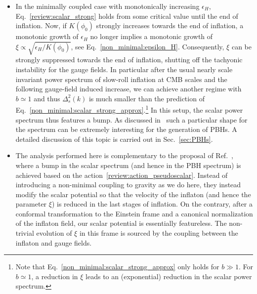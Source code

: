 \begin{itemize}
	\item In the minimally coupled case with monotonically increasing $\epsilon_H$, Eq.~\eqref{review:scalar_strong} holds from some critical value until the end of inflation. Now, if $K(\phi_0)$ strongly increases towards the end of inflation, a monotonic growth of $\epsilon_H$ no longer implies a monotonic growth of $\xi \propto \sqrt{\epsilon_H/K(\phi_0)}$, see Eq.~\eqref{non_minimal:epsilon_H}. Consequently, $\xi$ can be strongly suppressed towards the end of inflation, shutting off the tachyonic instability for the gauge fields. In particular after the usual nearly scale invariant power spectrum of slow-roll inflation at CMB scales and the following gauge-field induced increase, we can achieve another regime with $ b \simeq 1$ and thus $\Delta^2_s (k)$ is much smaller than the prediction of Eq.~\eqref{non_minimal:scalar_strong_approx}.\footnote{Note that Eq.~\eqref{non_minimal:scalar_strong_approx} only holds for $b \gg 1$. For $b \simeq 1$, a reduction in $\xi$ leads to an (exponential) reduction in the scalar power spectrum.} In this setup, the scalar power spectrum thus features a bump. As discussed in~\cite{Clesse:2015wea} such a particular shape for the spectrum can be extremely interesting for the generation of PBHs. A detailed discussion of this topic is carried out in Sec.~\ref{sec:PBHs}.

	\item The analysis performed here is complementary to the proposal of Ref.~\cite{Garcia-Bellido:2016dkw}, where a bump in the scalar spectrum (and hence in the PBH spectrum) is achieved based on the action~\eqref{review:action_pseudoscalar}. Instead of introducing a non-minimal coupling to gravity as we do here, they instead modify the scalar potential so that the velocity of the inflaton (and hence the parameter $\xi$) is reduced in the last stages of inflation. On the contrary, after a conformal transformation to the Einstein frame and a canonical normalization of the inflaton field, our scalar potential is essentially featureless. The non-trivial evolution of $\xi$ in this frame is sourced by the coupling between the inflaton and gauge fields.
\end{itemize}

